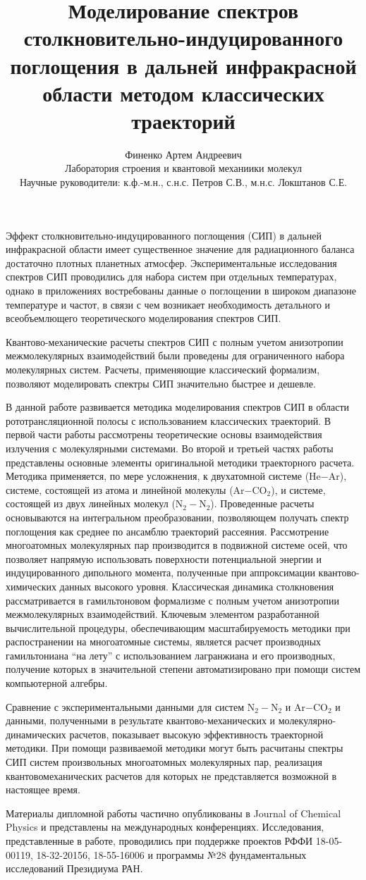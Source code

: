 \documentclass[12pt]{article}
\title{Моделирование спектров столк\-но\-ви\-тель\-но-ин\-ду\-ци\-ро\-ван\-ного поглощения в дальней инфракрасной области методом классических траекторий}
\date{}
\author{Финенко Артем Андреевич \\ Лаборатория строения и квантовой механиики молекул \\ Научные руководители: к.ф.-м.н., с.н.с. Петров С.В., м.н.с. Локштанов С.Е.}
\begin{document}
\maketitle
\vspace*{-1.5cm}
Эффект столкновительно-индуцированного поглощения (СИП) в дальней инфракрасной области имеет существенное значение для радиационного баланса достаточно плотных планетных атмосфер. Экспериментальные исследования спектров СИП проводились для набора систем при отдельных температурах, однако в приложениях востребованы данные о поглощении в широком диапазоне температуре и частот, в связи с чем возникает необходимость детального и всеобъемлющего теоретического моделирования спектров СИП. \par
Квантово-механические расчеты спектров СИП с полным учетом анизотропии межмолекулярных взаимодействий были проведены для ограниченного набора молекулярных систем. Расчеты, применяющие классический формализм, позволяют моделировать спектры СИП значительно быстрее и дешевле. \par  
В данной работе развивается методика моделирования спектров СИП в области рототрансляционной полосы с использованием классических траекторий. В первой части работы рассмотрены теоретические основы взаимодействия излучения с молекулярными системами. Во второй и третьей частях работы представлены основные элементы оригинальной методики траекторного расчета. Методика применяется, по мере усложнения, к двухатомной системе (He$-$Ar), системе, состоящей из атома и линейной молекулы (Ar$-$CO$_2$), и системе, состоящей из двух линейных молекул (N$_2-$N$_2$). Проведенные расчеты основываются на интегральном преобразовании, позволяющем получать спектр поглощения как среднее по ансамблю траекторий рассеяния. Рассмотрение многоатомных молекулярных пар производится в подвижной системе осей, что позволяет напрямую использовать поверхности потенциальной энергии и индуцированного дипольного момента, полученные при аппроксимации квантово-химических данных высокого уровня. Классическая динамика столкновения рассматривается в гамильтоновом формализме с полным учетом анизотропии межмолекулярных взаимодействий. Ключевым элементом разработанной вычислительной процедуры, обеспечивающим масштабируемость методики при распостранении на многоатомные системы, является расчет производных гамильтониана \enquote{на лету} с использованием лагранжиана и его производных, получение которых в значительной степени автоматизировано при помощи систем компьютерной алгебры. \par 
Сравнение с экспериментальными данными для систем N$_2-$N$_2$ и Ar$-$CO$_2$ и данными, полученными в результате кван\-тово-механических и молекулярно-динамических расчетов, показывает высокую эффективность траекторной методики. При помощи развиваемой методики могут быть расчитаны спектры СИП систем произвольных многоатомных молекулярных пар, реализация квантовомеханических расчетов для которых не представляется возможной в настоящее время. \par
Материалы дипломной работы частично опубликованы в Journal of Chemical Physics и представлены на международных конференциях. Исследования, представленные в работе, проводились при поддержке проектов РФФИ 18-05-00119, 18-32-20156, 18-55-16006 и программы №28 фундаментальных исследований Президиума РАН.
\end{document}
